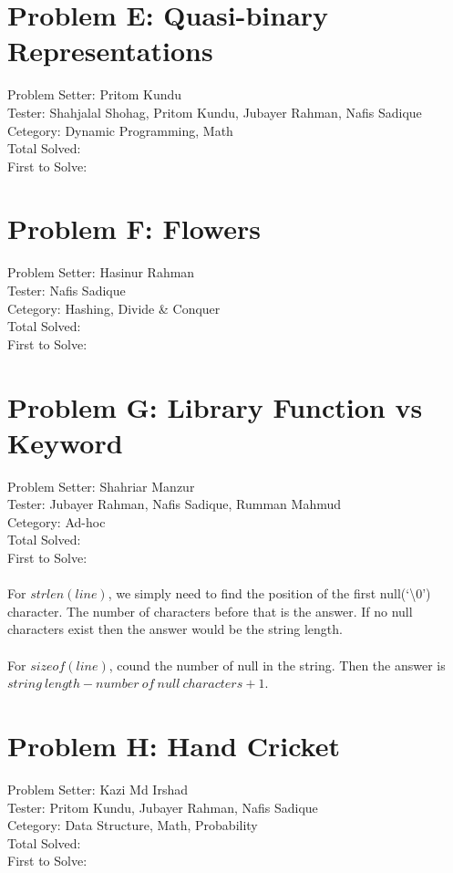 \documentclass[11pt,a4paper]{article}
\begin{document}
\section*{Problem E: Quasi-binary Representations}
Problem Setter: Pritom Kundu \\
Tester: Shahjalal Shohag, Pritom Kundu, Jubayer Rahman, Nafis Sadique \\
Cetegory: Dynamic Programming, Math \\
Total Solved:  \\
First to Solve: \\

\section*{Problem F: Flowers}
Problem Setter: Hasinur Rahman \\
Tester: Nafis Sadique \\
Cetegory: Hashing, Divide \& Conquer \\
Total Solved:  \\
First to Solve: \\

\section*{Problem G: Library Function vs Keyword}
Problem Setter: Shahriar Manzur \\
Tester: Jubayer Rahman, Nafis Sadique, Rumman Mahmud \\
Cetegory: Ad-hoc \\
Total Solved:  \\
First to Solve: \\
\\
For $strlen(line)$, we simply need to find the position of the first null(`\textbackslash 0') character.
The number of characters before that is the answer. If no null characters exist then
the answer would be the string length.
\\ \\
For $sizeof(line)$, cound the number of null in the string. Then the answer is 
$string\ length - number\ of\ null\ characters + 1$.


\section*{Problem H: Hand Cricket}
Problem Setter: Kazi Md Irshad \\
Tester: Pritom Kundu, Jubayer Rahman, Nafis Sadique \\
Cetegory: Data Structure, Math, Probability \\
Total Solved:  \\
First to Solve: \\
\end{document}
